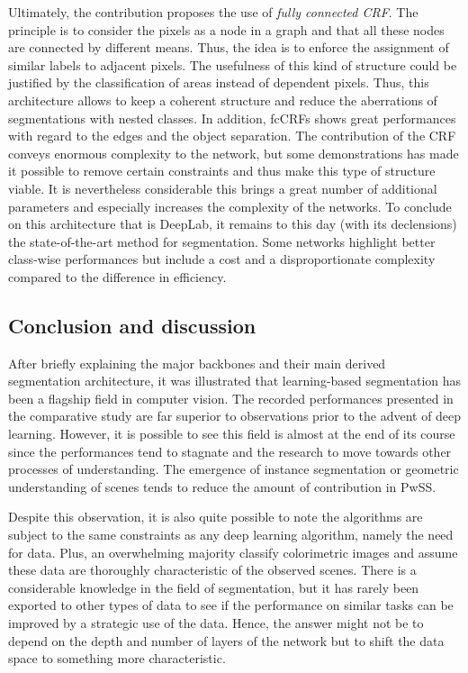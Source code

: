Ultimately, the contribution proposes the use of \emph{fully connected CRF}. The principle is to consider the pixels as a node in a graph and that all these nodes are connected by different means. Thus, the idea is to enforce the assignment of similar labels to adjacent pixels. The usefulness of this kind of structure could be justified by the classification of areas instead of dependent pixels. Thus, this architecture allows to keep a coherent structure and reduce the aberrations of segmentations with nested classes. In addition, fcCRFs shows great performances with regard to the edges and the object separation.
The contribution of the CRF conveys enormous complexity to the network, but some demonstrations \cite{krahenbuhl2011efficient} has made it possible to remove certain constraints and thus make this type of structure viable.
It is nevertheless considerable this brings a great number of additional parameters and especially increases the complexity of the networks.
To conclude on this architecture that is DeepLab, it remains to this day (with its declensions) the state-of-the-art method for segmentation. Some networks highlight better class-wise performances but include a cost and a disproportionate complexity compared to the difference in efficiency.

\subsection{Conclusion and discussion}\label{seg4}

After briefly explaining the major backbones and their main derived segmentation architecture, it was illustrated that learning-based segmentation has been a flagship field in computer vision. The recorded performances presented in the comparative study are far superior to observations prior to the advent of deep learning. However, it is possible to see this field is almost at the end of its course since the performances tend to stagnate and the research to move towards other processes of understanding. The emergence of instance segmentation or geometric understanding of scenes tends to reduce the amount of contribution in PwSS.

Despite this observation, it is also quite possible to note the algorithms are subject to the same constraints as any deep learning algorithm, namely the need for data. Plus, an overwhelming majority classify colorimetric images and assume these data are thoroughly characteristic of the observed scenes. There is a considerable knowledge in the field of segmentation, but it has rarely been exported to other types of data to see if the performance on similar tasks can be improved by a strategic use of the data.
Hence, the answer might not be to depend on the depth and number of layers of the network but to shift the data space to something more characteristic. 
\pagebreak
